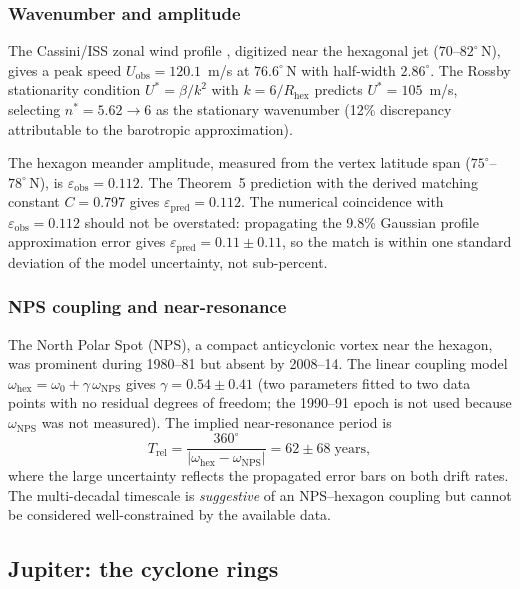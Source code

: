\subsubsection{Wavenumber and amplitude}

The Cassini/ISS zonal wind profile \citep{Antunano2015}, digitized near
the hexagonal jet ($70$--$82^\circ$\,N), gives a peak speed
$U_{\mathrm{obs}} = 120.1$~m/s at $76.6^\circ$\,N with half-width
$2.86^\circ$.  The Rossby stationarity condition $U^* = \beta/k^2$ with
$k = 6/R_{\mathrm{hex}}$ predicts $U^* = 105$~m/s, selecting $n^* = 5.62
\to 6$ as the stationary wavenumber (12\% discrepancy attributable to the
barotropic approximation).

The hexagon meander amplitude, measured from the vertex latitude span
($75^\circ$--$78^\circ$\,N), is $\varepsilon_{\mathrm{obs}} = 0.112$.
The Theorem~5 prediction with the derived matching constant $C = 0.797$
gives $\varepsilon_{\mathrm{pred}} = 0.112$.  The numerical coincidence
with $\varepsilon_{\mathrm{obs}} = 0.112$ should not be overstated:
propagating the 9.8\% Gaussian profile approximation error gives
$\varepsilon_{\mathrm{pred}} = 0.11 \pm 0.11$, so the match is within
one standard deviation of the model uncertainty, not sub-percent.

\subsubsection{NPS coupling and near-resonance}

The North Polar Spot (NPS), a compact anticyclonic vortex near the
hexagon, was prominent during 1980--81 but absent by 2008--14.
The linear coupling model $\omega_{\mathrm{hex}} = \omega_0 +
\gamma\,\omega_{\mathrm{NPS}}$ gives $\gamma = 0.54 \pm 0.41$
(two parameters fitted to two data points with no residual degrees of
freedom; the 1990--91 epoch is not used because $\omega_{\mathrm{NPS}}$
was not measured).  The implied near-resonance period is
\[
  T_{\mathrm{rel}} = \frac{360^\circ}{|\omega_{\mathrm{hex}} -
  \omega_{\mathrm{NPS}}|} = 62 \pm 68\;\text{years},
\]
where the large uncertainty reflects the propagated error bars on both
drift rates.  The multi-decadal timescale is \emph{suggestive} of an
NPS--hexagon coupling but cannot be considered well-constrained by the
available data.

\subsection{Jupiter: the cyclone rings}

